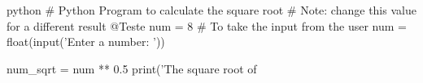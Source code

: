 \documentclass[aspectratio=169]{beamer} %
\begin{document}

\begin{BlackC}
  \begin{CodeM}{python}
# Python Program to calculate the square root
# Note: change this value for a different result
@Teste
num = 8 
# To take the input from the user
num = float(input('Enter a number: '))

num_sqrt = num ** 0.5
print('The square root of %
  \end{CodeM}
\end{BlackC}


%
\end{document}
